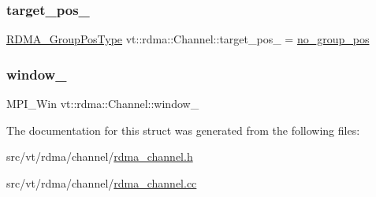 \subsubsection{\texorpdfstring{target\+\_\+pos\+\_\+}{target\_pos\_}}
{\footnotesize\ttfamily \hyperlink{structvt_1_1rdma_1_1_channel_ae67759ab26cc035489edd369ae207cfc}{R\+D\+M\+A\+\_\+\+Group\+Pos\+Type} vt\+::rdma\+::\+Channel\+::target\+\_\+pos\+\_\+ = \hyperlink{structvt_1_1rdma_1_1_channel_a5b8e4d79d272951f51a9856705110d24}{no\+\_\+group\+\_\+pos}\hspace{0.3cm}{\ttfamily [private]}}

\mbox{\label{structvt_1_1rdma_1_1_channel_aaecfddf4b74d52f4924d228ec46bcf59}} 
\subsubsection{\texorpdfstring{window\+\_\+}{window\_}}
{\footnotesize\ttfamily M\+P\+I\+\_\+\+Win vt\+::rdma\+::\+Channel\+::window\+\_\+\hspace{0.3cm}{\ttfamily [private]}}



The documentation for this struct was generated from the following files\+:\begin{DoxyCompactItemize}
\item 
src/vt/rdma/channel/\hyperlink{rdma__channel_8h}{rdma\+\_\+channel.\+h}\item 
src/vt/rdma/channel/\hyperlink{rdma__channel_8cc}{rdma\+\_\+channel.\+cc}\end{DoxyCompactItemize}
